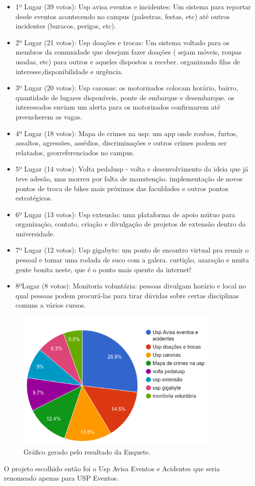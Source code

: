 \begin{itemize}
\item{ 1º Lugar (39 votos):} Usp avisa eventos e incidentes: Um sistema para reportar desde eventos acontecendo no campus (palestras, festas, etc) até outros incidentes (buracos, perigos, etc).
\item {2º Lugar (21 votos):} Usp doações e trocas: Um sistema voltado para os membros da comunidade que desejam fazer doações ( sejam móveis, roupas usadas, etc) para outros e aqueles dispostos a receber. organizando filas de interesse,disponibilidade e urgência.
\item {3º Lugar (20 votos):} Usp caronas: os motorizados colocam horário, bairro, quantidade de lugares disponíveis, ponte de embarque e desembarque. os interessados enviam um alerta para os motorizados confirmarem até preencherem as vagas.
\item {4º Lugar (18 votos):} Mapa de crimes na usp: um app onde roubos, furtos, assaltos, agressões, assédios, discriminações e outros crimes podem ser relatados, georreferenciados no campus.
\item {5º Lugar  (14 votos):} Volta pedalusp - volta e desenvolvimento da ideia que já teve adesão, mas morreu por falta de manutenção. implementação de novos pontos de troca de bikes mais próximos das faculdades e outros pontos estratégicos.
\item {6º Lugar (13 votos): } Usp extensão: uma plataforma de apoio mútuo para organização, contato, criação e divulgação de projetos de extensão dentro da universidade.
\item {7º Lugar (12 votos):} Usp gigabyte: um ponto de encontro virtual pra reunir o pessoal e tomar uma rodada de suco com a galera. curtição, azaração e muita gente bonita neste, que é o ponto mais quente da internet!
\item {8ºLugar  (8 votos):} Monitoria voluntária: pessoas divulgam horário e local no qual pessoas podem procurá-las para tirar dúvidas sobre certas disciplinas comuns a vários cursos.
\end{itemize}
\begin{figure}[htb]
\includegraphics[width=10cm]{figuras/poll_chart}
\caption{\label{fig:poll_chart} Gráfico gerado pelo resultado da Enquete.}
\end{figure}
\par O projeto escolhido então foi o Usp Avisa Eventos e Acidentes que seria renomeado apenas para USP Eventos.
